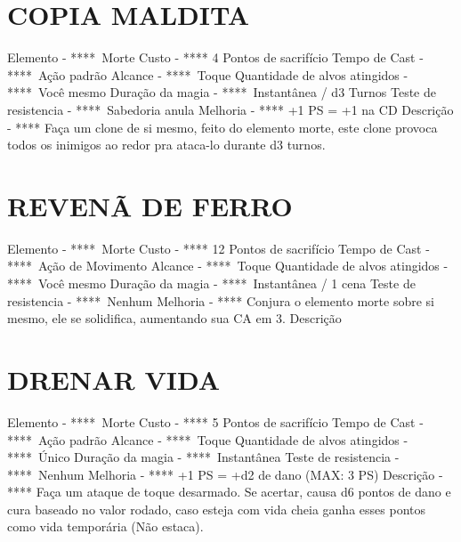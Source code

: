 \documentclass{article}%
\begin{document}
\section{COPIA MALDITA}%
\label{sec:COPIAMALDITA}%
Elemento {-} ****~Morte\newline%
Custo {-} **** 4 Pontos de sacrifício\newline%
Tempo de Cast {-} ****~Ação padrão\newline%
Alcance {-} ****~Toque\newline%
Quantidade de alvos atingidos {-} ****~Você mesmo\newline%
Duração da magia {-} ****~Instantânea / d3 Turnos\newline%
Teste de resistencia {-} ****~Sabedoria anula\newline%
Melhoria {-} **** +1 PS = +1 na CD\newline%
Descrição {-} **** Faça um clone de si mesmo, feito do elemento morte, este clone provoca todos os inimigos ao redor pra ataca{-}lo durante d3 turnos.\newline%

%
\section{REVENÃ DE FERRO}%
\label{sec:REVENDEFERRO}%
Elemento {-} ****~Morte\newline%
Custo {-} **** 12 Pontos de sacrifício\newline%
Tempo de Cast {-} ****~Ação de Movimento\newline%
Alcance {-} ****~Toque\newline%
Quantidade de alvos atingidos {-} ****~Você mesmo\newline%
Duração da magia {-} ****~Instantânea / 1 cena\newline%
Teste de resistencia {-} ****~Nenhum\newline%
Melhoria {-} **** Conjura o elemento morte sobre si mesmo, ele se solidifica, aumentando sua CA em 3.\newline%
Descrição \newline%

%
\section{DRENAR VIDA}%
\label{sec:DRENARVIDA}%
Elemento {-} ****~Morte\newline%
Custo {-} **** 5 Pontos de sacrifício\newline%
Tempo de Cast {-} ****~Ação padrão\newline%
Alcance {-} ****~Toque\newline%
Quantidade de alvos atingidos {-} ****~Único\newline%
Duração da magia {-} ****~Instantânea\newline%
Teste de resistencia {-} ****~Nenhum\newline%
Melhoria {-} **** +1 PS = +d2 de dano (MAX: 3 PS)\newline%
Descrição {-} **** Faça um ataque de toque desarmado. Se acertar, causa d6 pontos de dano e cura baseado no valor rodado, caso esteja com vida cheia ganha esses pontos como vida temporária (Não estaca).\newline%
\end{document}
